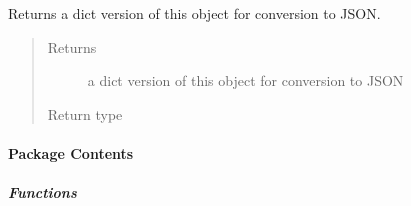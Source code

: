 \documentclass[letterpaper,10pt,english]{sphinxmanual}
\begin{document}
\begin{fulllineitems}
\begin{fulllineitems}
\end{fulllineitems}


\begin{fulllineitems}
\label{\detokenize{autoapi/pine/backend/models/index:pine.backend.models.CollectionUserPermissions.to_dict}}
\sphinxAtStartPar
Returns a dict version of this object for conversion to JSON.
\begin{quote}\begin{description}
\item[{Returns}] \leavevmode
\sphinxAtStartPar
a dict version of this object for conversion to JSON

\item[{Return type}] \leavevmode
\sphinxAtStartPar
{}

\end{description}\end{quote}

\end{fulllineitems}


\end{fulllineitems}



\paragraph{Package Contents}
\label{\detokenize{autoapi/pine/backend/index:package-contents}}

\subparagraph{Functions}
\label{\detokenize{autoapi/pine/backend/index:functions}}
\end{document}
